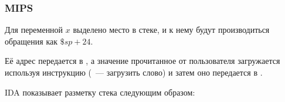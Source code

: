 \subsubsection{MIPS}

Для переменной $x$ выделено место в стеке, и к нему будут производиться обращения как $\$sp+24$.

Её адрес передается в \scanf, а значение прочитанное от пользователя загружается используя 
инструкцию  (~--- загрузить слово) и затем оно передается в \printf.



IDA показывает разметку стека следующим образом:



